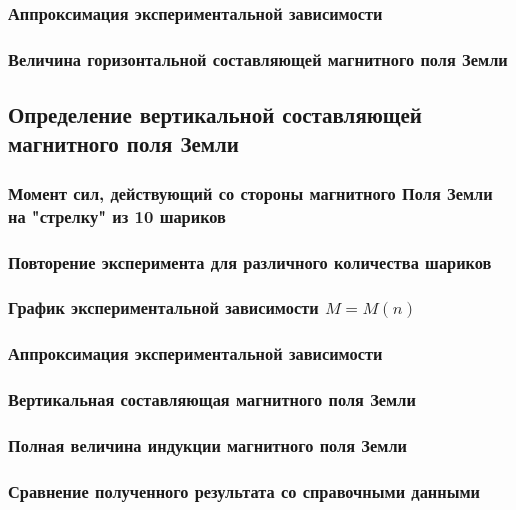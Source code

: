 \documentclass[a4paper, 12pt]{article}
\begin{document}
            \subsubsection{Аппроксимация экспериментальной зависимости}

            \subsubsection{Величина горизонтальной составляющей магнитного поля Земли}

        \subsection{Определение вертикальной составляющей магнитного поля Земли}

            \subsubsection{Момент сил, действующий со стороны магнитного Поля Земли на "стрелку" из 10 шариков}

            \subsubsection{Повторение эксперимента для различного количества шариков}

            \subsubsection{График экспериментальной зависимости $M = M(n)$}

            \subsubsection{Аппроксимация экспериментальной зависимости}

            \subsubsection{Вертикальная составляющая магнитного поля Земли}

            \subsubsection{Полная величина индукции магнитного поля Земли}

            \subsubsection{Сравнение полученного результата со справочными данными}
\end{document}
